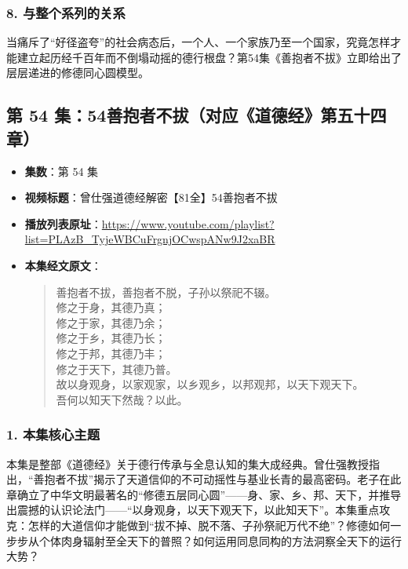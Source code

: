 \subsubsection{8. 与整个系列的关系}
当痛斥了“好径盗夸”的社会病态后，一个人、一个家族乃至一个国家，究竟怎样才能建立起历经千百年而不倒塌动摇的德行根盘？第54集《善抱者不拔》立即给出了层层递进的修德同心圆模型。

\clearpage

\subsection{第 54 集：54善抱者不拔（对应《道德经》第五十四章）}
\label{sec:ep54}

\begin{itemize}
    \item \textbf{集数}：第 54 集
    \item \textbf{视频标题}：曾仕强道德经解密【81全】54善抱者不拔
    \item \textbf{播放列表原址}：\url{https://www.youtube.com/playlist?list=PLAzB_TyjeWBCuFrgnjOCwspANw9J2xaBR}
    \item \textbf{本集经文原文}：
    \begin{quote}\kaishu
    善抱者不拔，善抱者不脱，子孙以祭祀不辍。\\
    修之于身，其德乃真；\\
    修之于家，其德乃余；\\
    修之于乡，其德乃长；\\
    修之于邦，其德乃丰；\\
    修之于天下，其德乃普。\\
    故以身观身，以家观家，以乡观乡，以邦观邦，以天下观天下。\\
    吾何以知天下然哉？以此。
    \end{quote}
\end{itemize}

\subsubsection{1. 本集核心主题}
本集是整部《道德经》关于德行传承与全息认知的集大成经典。曾仕强教授指出，“善抱者不拔”揭示了天道信仰的不可动摇性与基业长青的最高密码。老子在此章确立了中华文明最著名的“修德五层同心圆”——身、家、乡、邦、天下，并推导出震撼的认识论法门——“以身观身，以天下观天下，以此知天下”。本集重点攻克：怎样的大道信仰才能做到“拔不掉、脱不落、子孙祭祀万代不绝”？修德如何一步步从个体肉身辐射至全天下的普照？如何运用同息同构的方法洞察全天下的运行大势？

